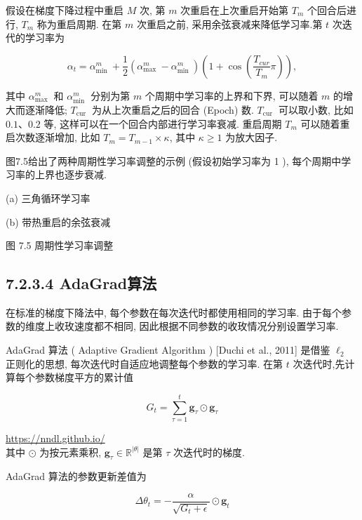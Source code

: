 \documentclass[10pt]{article}
\begin{document}
假设在梯度下降过程中重启 $M$ 次, 第 $m$ 次重启在上次重启开始第 $T_{m}$ 个回合后进行, $T_{m}$ 称为重启周期. 在第 $m$ 次重启之前, 采用余弦衰减来降低学习率.第 $t$ 次迭代的学习率为


\begin{equation*}
\alpha_{t}=\alpha_{\text {min }}^{m}+\frac{1}{2}\left(\alpha_{\text {max }}^{m}-\alpha_{\text {min }}^{m}\right)\left(1+\cos \left(\frac{T_{c u r}}{T_{m}} \pi\right)\right), \tag{7.13}
\end{equation*}


其中 $\alpha_{\text {max }}^{m}$ 和 $\alpha_{\text {min }}^{m}$ 分别为第 $m$ 个周期中学习率的上界和下界, 可以随着 $m$ 的增大而逐渐降低; $T_{\text {cur }}$ 为从上次重启之后的回合 (Epoch) 数. $T_{\text {cur }}$ 可以取小数, 比如 $0.1 、 0.2$ 等, 这样可以在一个回合内部进行学习率衰减. 重启周期 $T_{m}$ 可以随着重启次数逐渐增加, 比如 $T_{m}=T_{m-1} \times \kappa$, 其中 $\kappa \geq 1$ 为放大因子.

图7.5给出了两种周期性学习率调整的示例 (假设初始学习率为 1 ), 每个周期中学习率的上界也逐步衰减.



(a) 三角循环学习率



(b) 带热重启的余弦衰减

图 7.5 周期性学习率调整

\subsection*{7.2.3.4 AdaGrad算法}
在标准的梯度下降法中, 每个参数在每次迭代时都使用相同的学习率. 由于每个参数的维度上收玫速度都不相同, 因此根据不同参数的收玫情况分别设置学习率.

AdaGrad 算法 ( Adaptive Gradient Algorithm ) [Duchi et al., 2011] 是借鉴 $\ell_{2}$ 正则化的思想, 每次迭代时自适应地调整每个参数的学习率. 在第 $t$ 次迭代时,先计算每个参数梯度平方的累计值


\begin{equation*}
G_{t}=\sum_{\tau=1}^{t} \mathbf{g}_{\tau} \odot \mathbf{g}_{\tau} \tag{7.14}
\end{equation*}


\href{https://nndl.github.io/}{https://nndl.github.io/}\\
其中 $\odot$ 为按元素乘积, $\boldsymbol{g}_{\tau} \in \mathbb{R}^{|\theta|}$ 是第 $\tau$ 次迭代时的梯度.

AdaGrad 算法的参数更新差值为


\begin{equation*}
\Delta \theta_{t}=-\frac{\alpha}{\sqrt{G_{t}+\epsilon}} \odot \boldsymbol{g}_{t} \tag{7.15}
\end{equation*}
\end{document}
